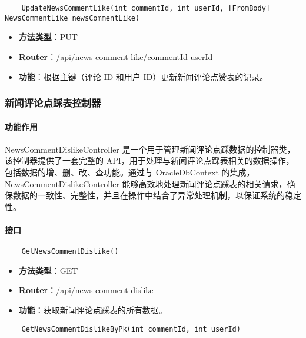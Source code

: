 \begin{verbatim}
	UpdateNewsCommentLike(int commentId, int userId, [FromBody] NewsCommentLike newsCommentLike)
\end{verbatim}

\begin{itemize}
	\item \textbf{方法类型}：PUT
	\item \textbf{Router}：/api/news-comment-like/{commentId}-{userId}
	\item \textbf{功能}：根据主键（评论 ID 和用户 ID）更新新闻评论点赞表的记录。
\end{itemize}

\subsubsection{新闻评论点踩表控制器}

\paragraph{功能作用}

NewsCommentDislikeController 是一个用于管理新闻评论点踩数据的控制器类，该控制器提供了一套完整的 API，用于处理与新闻评论点踩表相关的数据操作，包括数据的增、删、改、查功能。通过与 OracleDbContext 的集成，NewsCommentDislikeController 能够高效地处理新闻评论点踩表的相关请求，确保数据的一致性、完整性，并且在操作中结合了异常处理机制，以保证系统的稳定性。

\paragraph{接口}

\begin{verbatim}
	GetNewsCommentDislike()
\end{verbatim}

\begin{itemize}
	\item \textbf{方法类型}：GET
	\item \textbf{Router}：/api/news-comment-dislike
	\item \textbf{功能}：获取新闻评论点踩表的所有数据。
\end{itemize}

\begin{verbatim}
	GetNewsCommentDislikeByPk(int commentId, int userId)
\end{verbatim}

